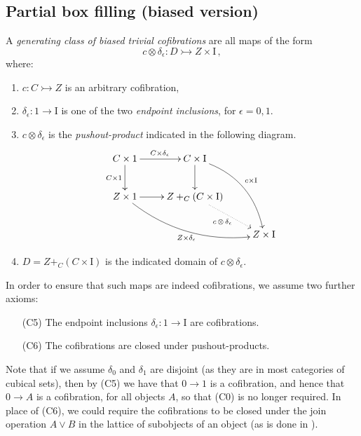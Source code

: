 \documentclass[12pt]{article}
\newcommand{\mono}{\ensuremath{\rightarrowtail}}
\newcommand{\ra}{\ensuremath{\rightarrow}}
\newcommand{\I}{\ensuremath{\mathrm{I}}}
\theoremstyle{remark}
\theoremstyle{definition}
\begin{document}
\subsection{Partial box filling (biased version)}\label{sec:biasedfibration}

A \emph{generating class of biased trivial cofibrations} are all maps of the form
\begin{equation}\label{eq:genclassTCof}
c \otimes \delta_\epsilon : D \mono Z\times \I\,,
\end{equation}
where:
\begin{enumerate}
\item  $c : C \mono Z$ is an arbitrary cofibration,

\item $\delta_\epsilon : 1 \ra \I$ is one of the two \emph{endpoint inclusions}, for $\epsilon = 0,1$.

\item $c\otimes\delta_\epsilon$ is the \emph{pushout-product} indicated in the following diagram.
\begin{equation}\label{diagram:pushoutproduct}
\xymatrix{
C\times 1 \ar[d]_{C\times 1} \ar[r]^{C\times \delta_\epsilon} & C\times \I \ar[d] \ar@/^4ex/ [rdd]^{c\times \I}\\
Z\times 1 \ar@/_4ex/ [rrd]_{Z\times \delta_\epsilon} \ar[r] &  Z +_C (C\times\I) \ar@{..>}[rd]_{c\, \otimes\, \delta_\epsilon} \\
&& Z\times\I
}
\end{equation}

\item $D = Z +_C (C\times\I)$ is the indicated domain of $c \otimes \delta_\epsilon$.
\end{enumerate}

In order to ensure that such maps are indeed cofibrations, we assume  two further axioms:
\begin{enumerate}\label{cofibration_axioms}
\item[(C5)] The endpoint inclusions $\delta_\epsilon : 1 \ra \I$ are cofibrations.
\item[(C6)] The cofibrations are closed under pushout-products.  
\end{enumerate}

Note that if we assume $\delta_0$ and $\delta_1$ are disjoint (as they are in most categories of cubical sets), then by (C5) we have that $0 \ra 1$ is a cofibration, and hence that $0\ra A$ is a cofibration, for all objects $A$, so that (C0) is no longer required.  In place of (C6), we could require the cofibrations to be closed under the join operation $A\vee B$ in the lattice of subobjects of an object (as is done in \cite{CCHM,OP}).
\medskip
\end{document}
